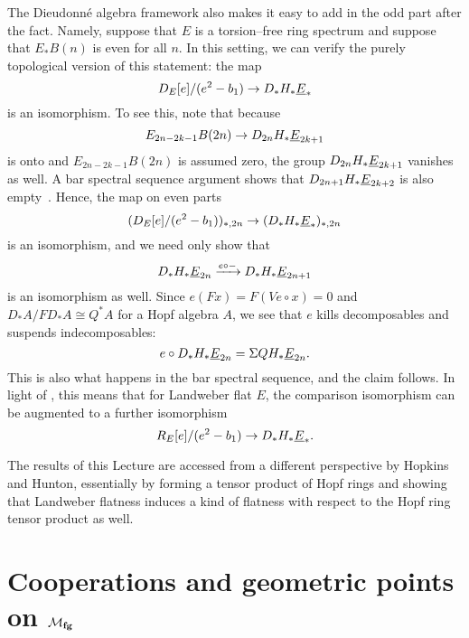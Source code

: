 \begin{remark}
The Dieudonn\'e algebra framework also makes it easy to add in the odd part after the fact.  Namely, suppose that $E$ is a torsion--free ring spectrum and suppose that $E_* B(n)$ is even for all $n$.  In this setting, we can verify the purely topological version of this statement: the map \[D_E[e] / (e^2 - b_1) \to D_* H_* \underline{\smash{E}}_{*}\] is an isomorphism.  To see this, note that because \[E_{2n-2k-1} B(2n) \to D_{2n} H_* \underline{\smash{E}}_{2k+1}\] is onto and $E_{2n-2k-1} B(2n)$ is assumed zero, the group $D_{2n} H_* \underline{\smash{E}}_{2k+1}$ vanishes as well.  A bar spectral sequence argument shows that $D_{2n+1} H_* \underline{\smash{E}}_{2k+2}$ is also empty~\cite[Lemma 11.5.1]{GoerssDieudonne}.  Hence, the map on even parts \[(D_E[e] / (e^2 - b_1))_{*, 2n} \to (D_* H_* \underline{\smash{E}}_{*})_{*, 2n}\] is an isomorphism, and we need only show that \[D_* H_* \underline{\smash{E}}_{2n} \xrightarrow{e \circ -} D_* H_* \underline{\smash{E}}_{2n+1}\] is an isomorphism as well.  Since $e(Fx) = F(Ve \circ x) = 0$ and $D_* A / FD_* A \cong Q^* A$ for a Hopf algebra $A$, we see that $e$ kills decomposables and suspends indecomposables: \[e \circ D_* H_* \underline{\smash{E}}_{2n} = \Sigma QH_* \underline{\smash{E}}_{2n}.\]  This is also what happens in the bar spectral sequence, and the claim follows.  In light of , this means that for Landweber flat $E$, the comparison isomorphism can be augmented to a further isomorphism \[R_E[e] / (e^2 - b_1) \to D_* H_* \underline{\smash{E}}_{*}.\]
\end{remark}

\begin{remark}
The results of this Lecture are accessed from a different perspective by Hopkins and Hunton, essentially by forming a tensor product of Hopf rings and showing that Landweber flatness induces a kind of flatness with respect to the Hopf ring tensor product as well.
\end{remark}














\section{Cooperations and geometric points on \texorpdfstring{$\mathcal{M}_{\mathbf{fg}}$}{Mfg}}\label{CoopnsForMoravaKandHA}

